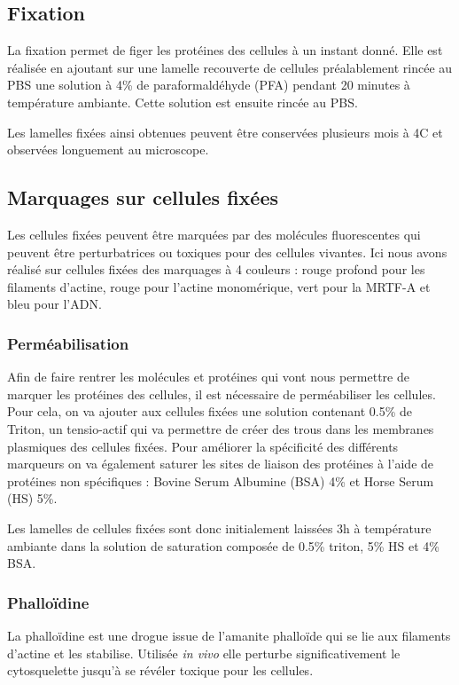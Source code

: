 	\subsection{Fixation}
	La fixation permet de figer les protéines des cellules à un instant donné. Elle est réalisée en ajoutant sur une lamelle recouverte de cellules préalablement rincée au PBS une solution à 4\% de paraformaldéhyde (PFA) pendant 20 minutes à température ambiante. Cette solution est ensuite rincée au PBS. 
	
	Les lamelles fixées ainsi obtenues peuvent être conservées plusieurs mois à 4\degres   C et observées longuement au microscope. 
	\subsection{Marquages sur cellules fixées}
	Les cellules fixées peuvent être marquées par des molécules fluorescentes qui peuvent être perturbatrices ou toxiques pour des cellules vivantes. Ici nous avons réalisé sur cellules fixées des marquages à 4 couleurs : rouge profond pour les filaments d'actine, rouge pour l'actine monomérique, vert pour la MRTF-A et bleu pour l'ADN. 
		\subsubsection{Perméabilisation}
		Afin de faire rentrer les molécules et protéines qui vont nous permettre de marquer les protéines des cellules, il est nécessaire de perméabiliser les cellules. Pour cela, on va ajouter aux cellules fixées une solution contenant 0.5\% de Triton, un tensio-actif qui va permettre de créer des trous dans les membranes plasmiques des cellules fixées. 
		Pour améliorer la spécificité des différents marqueurs on va également saturer les sites de liaison des protéines à l'aide de protéines non spécifiques : Bovine Serum Albumine (BSA) 4\% et Horse Serum (HS) 5\%. 
		
		Les lamelles de cellules fixées sont donc initialement laissées 3h à température ambiante dans la solution de saturation composée de 0.5\% triton, 5\% HS et 4\% BSA. 
		
		\subsubsection{Phalloïdine}
		La phalloïdine est une drogue issue de l'amanite phalloïde qui se lie aux filaments d'actine et les stabilise. Utilisée \emph{in vivo} elle perturbe significativement le cytosquelette jusqu'à se révéler toxique pour les cellules. 
		
